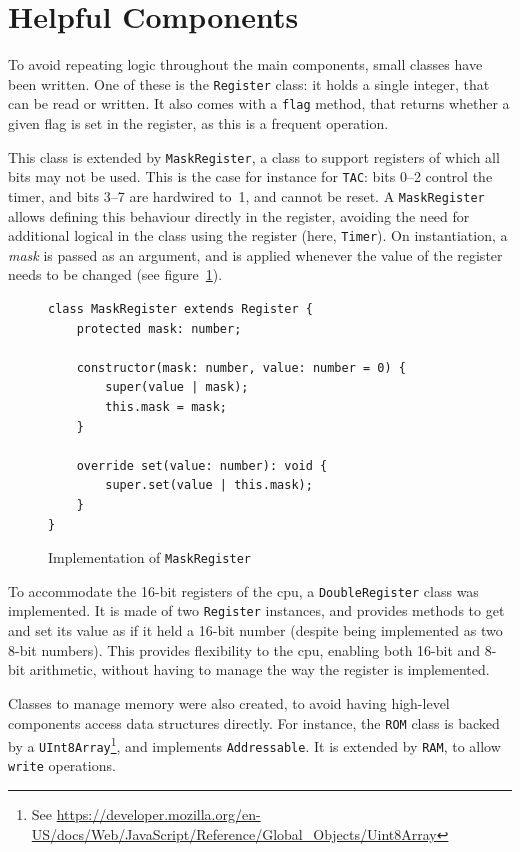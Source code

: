 \documentclass[11pt]{informatics-report}
\newcommand{\ftnt}[1]{\footnote{See \url{#1}}}
\begin{document}
\section{Helpful Components}

To avoid repeating logic throughout the main components, small classes have been written. One of these is the \texttt{Register} class: it holds a single integer, that can be read or written. It also comes with a \texttt{flag} method, that returns whether a given flag is set in the register, as this is a frequent operation.

This class is extended by \texttt{MaskRegister}, a class to support registers of which all bits may not be used. This is the case for instance for \texttt{TAC}: bits 0--2 control the timer, and bits 3--7 are hardwired to~1, and cannot be reset. A \texttt{MaskRegister} allows defining this behaviour directly in the register, avoiding the need for additional logical in the class using the register (here, \texttt{Timer}). On instantiation, a \textit{mask} is passed as an argument, and is applied whenever the value of the register needs to be changed (see figure~\ref{fig:mask-register}).

\begin{figure}[h]
    \begin{verbatim}
class MaskRegister extends Register {
    protected mask: number;

    constructor(mask: number, value: number = 0) {
        super(value | mask);
        this.mask = mask;
    }

    override set(value: number): void {
        super.set(value | this.mask);
    }
}
    \end{verbatim}
    \caption{Implementation of \texttt{MaskRegister}}
    \label{fig:mask-register}
\end{figure}

To accommodate the 16-bit registers of the \gls{cpu}, a \texttt{DoubleRegister} class was implemented. It is made of two \texttt{Register} instances, and provides methods to get and set its value as if it held a 16-bit number (despite being implemented as two 8-bit numbers). This provides flexibility to the \gls{cpu}, enabling both 16-bit and 8-bit arithmetic, without having to manage the way the register is implemented.

Classes to manage memory were also created, to avoid having high-level components access data structures directly. For instance, the \texttt{ROM} class is backed by a \texttt{UInt8Array}\ftnt{https://developer.mozilla.org/en-US/docs/Web/JavaScript/Reference/Global_Objects/Uint8Array}, and implements \texttt{Addressable}. It is extended by \texttt{RAM}, to allow \texttt{write} operations.
\end{document}
